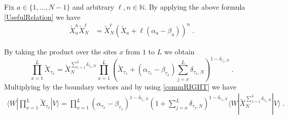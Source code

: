 \documentclass[10pt]{article}
\numberwithin{equation}{section}
\numberwithin{equation}{subsection}
\newcommand{\dt}{\;.}
\begin{document}
Fix $ a\in \{1,\ldots,N-1\}$ and arbitrary $ \ell,n\in \mathbb{N}$. By applying the above formula \eqref{UsefulRelation} we have
\begin{align}\label{usefulRelaton-many}
	\widetilde{X}_{a}^{n}\widetilde{X}_{N}^{\ell}&=%
	\widetilde{X}_{N}^{\ell}\left(\widetilde{X}_{a}+\ell(\alpha_{a}-\beta_{a})\right)^{n}\dt
\end{align}
\begin{comment}
therefore 
\begin{align*}
	\widetilde{X}_{1}^{n_{1}}\ldots\widetilde{X}_{N-1}^{n_{N-1}}\widetilde{X}_{N}^{n_{N}}=\widetilde{X}_{N}^{n_{N}}\prod_{a=1}^{N-1}\left(\widetilde{X}_{a}+n_{N}(\alpha_{a}-\beta_{a})\right)^{n_{a}}\dt
\end{align*}
\end{comment}
By taking the product over the sites $x$ from $1$ to $L$ we obtain 
\begin{equation}
	\prod_{x=1}^{L}\widetilde{X}_{\tau_{x}}=\widetilde{X}_{N}^{\sum_{x=1}^{L}\delta_{\tau_{x},N}}\prod_{x=1}^{L}\left(\widetilde{X}_{\tau_{x}}+(\alpha_{\tau_{x}}-\beta_{\tau_{x}})\sum_{j=x}^{L}\delta_{\tau_{x},N}\right)^{1-\delta_{\tau_{x},N}}\dt
\end{equation}
Multiplying by the boundary vectors and by using \eqref{commRIGHT} we have 
\begin{align}
	\langle W|\prod_{x=1}^{L}\widetilde{X}_{\tau_{x}}
	|V \rangle=
	\prod_{x=1}^{L}\left(\alpha_{\tau_{x}}-\beta_{\tau_{x}}\right)^{1-\delta_{\tau_{x},N}}\left(1+\sum_{j=x}^{L}\delta_{\tau_{j},N}\right)^{1-\delta_{\tau_{x},N}}\langle W|\widetilde{X}_{N}^{\sum_{x=1}^{L}\delta_{\tau_{x},N}}|V\rangle \dt
\end{align}
\end{document}
